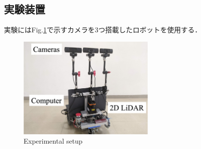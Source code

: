 \documentclass{sice-si}
\begin{document}
\subsection{実験装置}
実験にはFig.\ref{fig:gamma}で示すカメラを3つ搭載したロボットを使用する．
\begin{figure}[htbp]
    \centering
     \includegraphics[height=50mm]{./figs/gamma_sensor.png}
     \caption{Experimental setup}\label{fig:gamma}
\end{figure}
\end{document}
